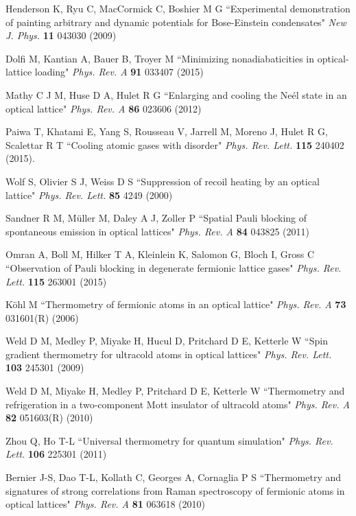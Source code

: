 \documentclass[pra,letterpaper,twocolumn,showpacs,superscriptaddress]{revtex4}
\begin{document}
\begin{thebibliography}{300}
 Henderson K, Ryu C, MacCormick C, Boshier M G
``Experimental demonstration of painting arbitrary and dynamic potentials for Bose-Einstein condensates"
{\it New J. Phys.} \textbf{11} 043030 (2009)

 Dolfi M, Kantian A, Bauer B, Troyer M
``Minimizing nonadiabaticities in optical-lattice loading"
{\it Phys. Rev. A} \textbf{91} 033407 (2015)

 Mathy C J M, Huse D A, Hulet R G 
``Enlarging and cooling the Ne\'el state in an optical lattice"
{\it Phys. Rev. A} \textbf{86} 023606 (2012)

 Paiwa T, Khatami E, Yang S, Rousseau V, Jarrell M, Moreno J, Hulet R G, Scalettar R T
``Cooling atomic gases with disorder"
{\it Phys. Rev. Lett.} \textbf{115} 240402 (2015).

 Wolf S, Olivier S J, Weiss D S 
``Suppression of recoil heating by an optical lattice" {\it Phys. Rev. Lett.} \textbf{85} 4249 (2000)

 Sandner R M, M\"uller M, Daley A J, Zoller P ``Spatial Pauli blocking of spontaneous emission in optical lattices"
{\it Phys. Rev. A} \textbf{84} 043825 (2011)

 Omran A, Boll M, Hilker T A, Kleinlein K, Salomon G, Bloch I, Gross C
``Observation of Pauli blocking in degenerate fermionic lattice gases" {\it Phys. Rev. Lett.} \textbf{115} 263001 (2015)

 K\"ohl M ``Thermometry of fermionic atoms in an optical lattice" {\it Phys. Rev. A} \textbf{73} 031601(R) (2006)

 Weld D M, Medley P, Miyake H, Hucul D, Pritchard D E, Ketterle W
``Spin gradient thermometry for ultracold atoms in optical lattices" {\it Phys. Rev. Lett.} \textbf{103} 245301 (2009)

 Weld D M, Miyake H, Medley P, Pritchard D E, Ketterle W
``Thermometry and refrigeration in a two-component Mott insulator of ultracold atoms"
{\it Phys. Rev. A} \textbf{82} 051603(R) (2010)

 Zhou Q, Ho T-L ``Universal thermometry for quantum simulation"
{\it Phys. Rev. Lett.} \textbf{106} 225301 (2011)

 Bernier J-S, Dao T-L, Kollath C, Georges A, Cornaglia P S
``Thermometry and signatures of strong correlations from Raman spectroscopy of fermionic atoms in optical lattices"
{\it Phys. Rev. A} \textbf{81} 063618 (2010)


\end{thebibliography}
\end{document}
